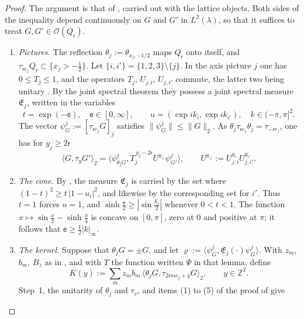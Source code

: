 \documentclass[11pt]{amsart}
\theoremstyle{definition}
\begin{document}
\begin{proof}
The argument is that of \cite[Lemmas~12.36--12.38, Theorem~12.39]{QEDII}, carried out with the lattice objects.
Both sides of the inequality depend continuously on $G$ and $G'$ in $L^2(\lambda)$, so that it suffices to treat $G,G'\in\mathcal O(Q_{\mathsf r})$.
\begin{enumerate}
\item[1.] \emph{Pictures.}
The reflection $\theta_j:=\theta_{x_j,-1/2}$ maps $Q_{\mathsf r}$ onto itself, and $\tau_{\mathsf re_j}Q_{\mathsf r}\subset\{x_j>-\frac12\}$.
Let $\{i,i'\}=\{1,2,3\}\setminus\{j\}$.
In the axis picture $j$ one has $0\le T_j\le1$, and the operators $T_j$, $U_{j,i}$, $U_{j,i'}$ commute, the latter two being unitary \cite[Lemma~10.9, Definition~10.11]{QEDII}.
By the joint spectral theorem they possess a joint spectral measure $\mathfrak E_j$, written in the variables
\begin{equation*}
t=\exp(-\mathsf e),\quad\mathsf e\in[0,\infty],\qquad u=(\exp ik_i,\exp ik_{i'}),\quad k\in(-\pi,\pi]^2.
\end{equation*}
The vector $\psi^j_G:=[\tau_{\mathsf re_j}G]_j$ satisfies $\|\psi^j_G\|\le\|G\|_2$.
As $\theta_j\tau_{\mathsf re_j}\theta_j=\tau_{-\mathsf re_j}$, one has for $y_j\ge2\mathsf r$
\begin{equation*}
\langle G,\tau_yG'\rangle_2=\bigl\langle\psi^j_{\theta_jG},T_j^{\,y_j-2\mathsf r}U^{y_\perp}\psi^j_{G'}\bigr\rangle,\qquad U^{y_\perp}:=U_{j,i}^{y_i}U_{j,i'}^{y_{i'}}.
\end{equation*}
\item[2.] \emph{The cone.}
By \cite[Theorem~10.12\,(b)]{QEDII}, the measure $\mathfrak E_j$ is carried by the set where $(1-t)^2\ge t\,|1-u_i|^2$, and likewise by the corresponding set for $i'$.
Thus $t=1$ forces $u=1$, and $\sinh\frac{\mathsf e}2\ge|\sin\frac{k_i}2|$ whenever $0<t<1$.
The function $x\mapsto\sin\frac x2-\sinh\frac x4$ is concave on $[0,\pi]$, zero at $0$ and positive at $\pi$; it follows that $\mathsf e\ge\frac12|k|_\infty$.
\item[3.] \emph{The kernel.}
Suppose that $\theta_jG=\pm G$, and let $\varrho:=\langle\psi^j_G,\mathfrak E_j(\cdot)\psi^j_G\rangle$.
With $z_m$, $b_m$, $B_z$ as in \cite[Lemma~12.35]{QEDII}, and with $\Upsilon$ the function written $\Psi$ in that lemma, define
\begin{equation*}
K(y):=\sum_mz_mb_m\,\langle\theta_jG,\tau_{2\mathsf rme_j+y}G\rangle_2,\qquad y\in\mathbb Z^2.
\end{equation*}
Step~1, the unitarity of $\theta_j$ and $\tau_v$, and items (1) to (5) of the proof of \cite[Lemma~12.37]{QEDII} give

\end{enumerate}
\end{proof}
\end{document}
